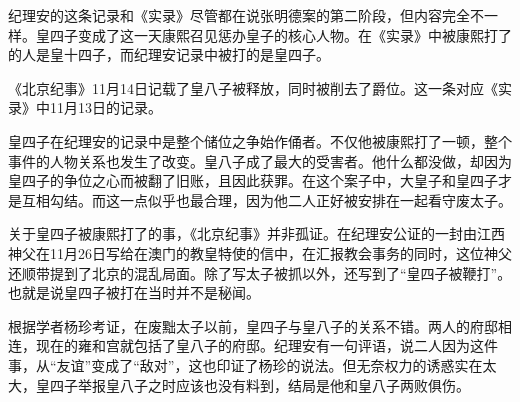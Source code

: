 
纪理安的这条记录和《实录》尽管都在说张明德案的第二阶段，但内容完全不一样。皇四子变成了这一天康熙召见惩办皇子的核心人物。在《实录》中被康熙打了的人是皇十四子，而纪理安记录中被打的是皇四子。



《北京纪事》11月14日记载了皇八子被释放，同时被削去了爵位。这一条对应《实录》中11月13日的记录。



皇四子在纪理安的记录中是整个储位之争始作俑者。不仅他被康熙打了一顿，整个事件的人物关系也发生了改变。皇八子成了最大的受害者。他什么都没做，却因为皇四子的争位之心而被翻了旧账，且因此获罪。在这个案子中，大皇子和皇四子才是互相勾结。而这一点似乎也最合理，因为他二人正好被安排在一起看守废太子。



关于皇四子被康熙打了的事，《北京纪事》并非孤证。在纪理安公证的一封由江西神父在11月26日写给在澳门的教皇特使的信中，在汇报教会事务的同时，这位神父还顺带提到了北京的混乱局面。除了写太子被抓以外，还写到了“皇四子被鞭打”。也就是说皇四子被打在当时并不是秘闻。



根据学者杨珍考证，在废黜太子以前，皇四子与皇八子的关系不错。两人的府邸相连，现在的雍和宫就包括了皇八子的府邸。纪理安有一句评语，说二人因为这件事，从“友谊”变成了“敌对”，这也印证了杨珍的说法。但无奈权力的诱惑实在太大，皇四子举报皇八子之时应该也没有料到，结局是他和皇八子两败俱伤。

